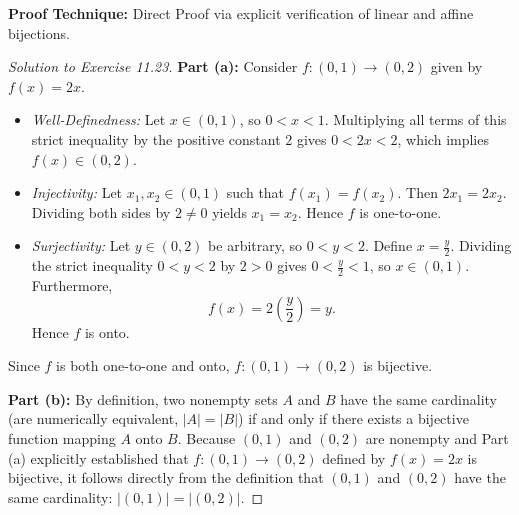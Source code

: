 \documentclass[11pt, letterpaper]{article}
\theoremstyle{definition}
\theoremstyle{remark}
\begin{document}
\medskip
\textbf{Proof Technique:} Direct Proof via explicit verification of linear and affine bijections.

\begin{proof}[Solution to Exercise 11.23]
\textbf{Part (a):} Consider $f : (0, 1) \to (0, 2)$ given by $f(x) = 2x$.
\begin{itemize}
    \item \emph{Well-Definedness:} Let $x \in (0, 1)$, so $0 < x < 1$. Multiplying all terms of this strict inequality by the positive constant $2$ gives $0 < 2x < 2$, which implies $f(x) \in (0, 2)$.
    \item \emph{Injectivity:} Let $x_1, x_2 \in (0, 1)$ such that $f(x_1) = f(x_2)$. Then $2x_1 = 2x_2$. Dividing both sides by $2 \neq 0$ yields $x_1 = x_2$. Hence $f$ is one-to-one.
    \item \emph{Surjectivity:} Let $y \in (0, 2)$ be arbitrary, so $0 < y < 2$. Define $x = \frac{y}{2}$. Dividing the strict inequality $0 < y < 2$ by $2 > 0$ gives $0 < \frac{y}{2} < 1$, so $x \in (0, 1)$. Furthermore,
    \[
    f(x) = 2\left(\frac{y}{2}\right) = y.
    \]
    Hence $f$ is onto.
\end{itemize}
Since $f$ is both one-to-one and onto, $f : (0, 1) \to (0, 2)$ is bijective.

\medskip
\textbf{Part (b):} By definition, two nonempty sets $A$ and $B$ have the same cardinality (are numerically equivalent, $|A| = |B|$) if and only if there exists a bijective function mapping $A$ onto $B$. Because $(0, 1)$ and $(0, 2)$ are nonempty and Part (a) explicitly established that $f : (0, 1) \to (0, 2)$ defined by $f(x) = 2x$ is bijective, it follows directly from the definition that $(0, 1)$ and $(0, 2)$ have the same cardinality: $|(0, 1)| = |(0, 2)|$.


\end{proof}
\end{document}

